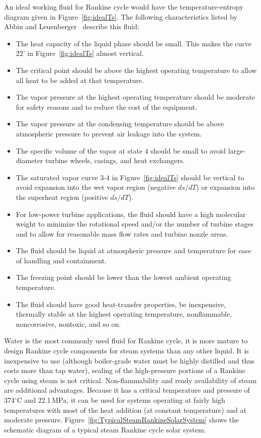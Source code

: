 An ideal working fluid for Rankine cycle would have the temperature-entropy diagram given in Figure~\ref{fig:idealTs}. The following characteristics listed by Abbin and Leuenberger~\cite{Abbin1977} describe this fluid:
\begin{itemize}
  \item The heat capacity of the liquid phase should be small. This makes the curve 22' in Figure~\ref{fig:idealTs} almost vertical.
  \item The critical point should be above the highest operating temperature to allow all heat to be added at that temperature.
  \item The vapor pressure at the highest operating temperature should be moderate for safety reasons and to reduce the cost of the equipment.
  \item The vapor pressure at the condensing temperature should be above atmospheric pressure to prevent air leakage into the system.
  \item The specific volume of the vapor at state 4 should be small to avoid large-diameter turbine wheels, casings, and heat exchangers.
  \item The saturated vapor curve 3-4 in Figure~\ref{fig:idealTs} should be vertical to avoid expansion into the wet vapor region (negative $ds/dT$) or expansion into the superheat region (positive $ds/dT$).
  \item For low-power turbine applications, the fluid should have a high molecular weight to minimize the rotational speed and/or the number of turbine stages and to allow for reasonable mass flow rates and turbine nozzle areas.
  \item The fluid should be liquid at atmospheric pressure and temperature for ease of handling and containment.
  \item The freezing point should be lower than the lowest ambient operating temperature.
  \item The fluid should have good heat-transfer properties, be inexpensive, thermally stable at the highest operating temperature, nonflammable, noncorrosive, nontoxic, and so on.
\end{itemize}

Water is the most commonly used fluid for Rankine cycle, it is more mature to design Rankine cycle components for steam systems than any other liquid. It is inexpensive to use (although boiler-grade water must be highly distilled and thus costs more than tap water), sealing of the high-pressure portions of a Rankine cycle using steam is not critical. Non-flammability and ready availability of steam are additional advantages. Because it has a critical temperature and pressure of 374$\mathrm{^\circ C}$ and 22.1$\,\mathrm{MPa}$, it can be used for systems operating at fairly high temperatures with most of the heat addition (at constant temperature) and at moderate pressure. Figure~\ref{fig:TypicalSteamRankineSolarSystem} shows the schematic diagram of a typical steam Rankine cycle solar system.


